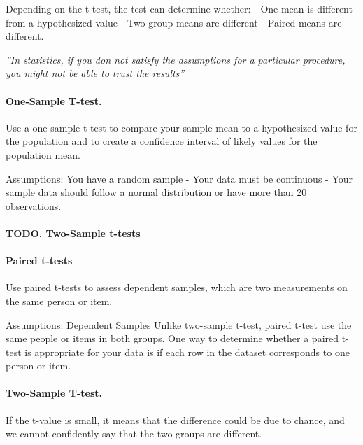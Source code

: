 \documentclass[11pt]{article}
\begin{document}
Depending on the t-test, the test can determine whether: - One mean is
different from a hypothesized value - Two group means are different -
Paired means are different.

\emph{''In statistics, if you don not satisfy the assumptions for a
particular procedure, you might not be able to trust the results''}

\hypertarget{one-sample-t-test.}{%
\paragraph{One-Sample T-test.}\label{one-sample-t-test.}}

Use a one-sample t-test to compare your sample mean to a hypothesized
value for the population and to create a confidence interval of likely
values for the population mean.

Assumptions: You have a random sample - Your data must be
continuous - Your sample data should follow a normal distribution or
have more than 20 observations.

\hypertarget{todo.-two-sample-t-tests}{%
\paragraph{TODO. Two-Sample t-tests}\label{todo.-two-sample-t-tests}}

\hypertarget{paired-t-tests}{%
\paragraph{Paired t-tests}\label{paired-t-tests}}

Use paired t-tests to assess dependent samples, which are two
measurements on the same person or item.

Assumptions: Dependent Samples Unlike two-sample t-test,
paired t-test use the same people or items in both groups. One way to
determine whether a paired t-test is appropriate for your data is if
each row in the dataset corresponds to one person or item.

\hypertarget{two-sample-t-test.}{%
\paragraph{Two-Sample T-test.}\label{two-sample-t-test.}}

If the t-value is small, it means that the difference could be due to
chance, and we cannot confidently say that the two groups are different.
\end{document}
